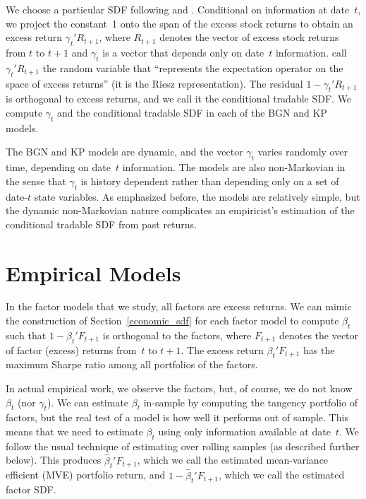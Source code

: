 \documentclass[12pt]{scrarticle}
\begin{document}
We choose a particular SDF following \cite{hansen-richard} and \citet{britten-jones}.  Conditional on information at date~$t$, we project the constant~1 onto the span of the excess stock returns to obtain an excess return $\gamma_t'R_{t+1}$, where $R_{t+1}$ denotes the vector of excess stock returns from $t$ to $t+1$ and $\gamma_t$ is a vector that depends only on date~$t$ information.  \cite{hansen-richard} call $\gamma_t'R_{t+1}$ the random variable that ``represents the expectation operator on the space of excess returns'' (it is the Riesz representation).  The residual $1-\gamma_t'R_{t+1}$ is orthogonal to excess returns, and we call it the conditional tradable SDF.  We  compute $\gamma_t$ and the conditional tradable SDF in each of the BGN and KP models.

The BGN and KP models are dynamic, and the vector $\gamma_t$ varies randomly over time, depending on date~$t$ information.  The models are also non-Markovian in the sense that $\gamma_t$ is history dependent rather than depending only on a set of date-$t$ state variables.  As emphasized before, the models are relatively simple, but the dynamic non-Markovian nature complicates an empiricist's estimation of the conditional tradable SDF from past returns.


\section{Empirical Models}\label{sec:econometric models}\label{sec:empirical models}

In the factor models that we study, all factors are excess returns.  We can mimic the construction of Section~\ref{economic_sdf} for each factor model to compute $\beta_t$ such that $1-\beta_t'F_{t+1}$ is orthogonal to the factors, where $F_{t+1}$ denotes the vector of factor (excess) returns from~$t$ to $t+1$.  The excess return $\beta_t'F_{t+1}$ has the maximum Sharpe ratio among all portfolios of the factors.  

In actual empirical work, we observe the factors, but, of course, we do not know $\beta_t$ (nor $\gamma_t$).  We can estimate $\beta_t$ in-sample by computing the tangency portfolio of factors, but the real test of a model is how well it performs out of sample.  This means that we need to estimate $\beta_t$ using only information available at date~$t$.  We follow the usual technique of estimating over rolling samples (as described further below).  This produces $\hat \beta_t'F_{t+1}$, which we call the estimated mean-variance efficient (MVE) portfolio return, and $1-\hat \beta_t'F_{t+1}$, which we call the estimated factor SDF.
\end{document}
